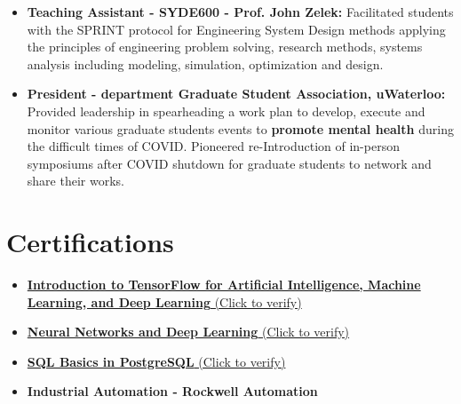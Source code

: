 \documentclass{ExpressiveResume}
\begin{document}
\begin{itemize}
\item {\textbf{Teaching Assistant - SYDE600 - Prof. John Zelek:} Facilitated students with the SPRINT protocol for Engineering System Design methods applying the principles of engineering problem solving, research methods, systems analysis including modeling, simulation, optimization and design.}
\item {\textbf{\textcolor{link_blue}{President} - department \textcolor{link_blue}{Graduate Student Association}, uWaterloo:} Provided leadership in spearheading a work plan to develop, execute and monitor various graduate students events to \textbf{\textcolor{link_blue}{promote mental health}} during the difficult times of COVID. Pioneered re-Introduction of in-person symposiums after COVID shutdown for graduate students to network and share their works.}
\newline


\end{itemize}


\section{\textcolor{link_blue}{Certifications}}
\begin{itemize}
\item {\href{https://www.coursera.org/account/accomplishments/verify/C7C8CPGARXJW?utm_source=link&utm_medium=certificate&utm_content=cert_image&utm_campaign=pdf_header_button&utm_product=course}{\textbf{Introduction to TensorFlow for Artificial Intelligence, Machine Learning, and Deep Learning} (Click to verify)}}
\item {\href{https://www.coursera.org/account/accomplishments/verify/ZRBWP4ZFF8YX}{\textbf{Neural Networks and Deep Learning} (Click to verify)}}
\item {\href{https://learnsql.com/files/course-certificate/dcQdkgNWcDbdVjeWXGwKXFTHqxkLQXbYCCJYexdB}{\textbf{SQL Basics in PostgreSQL} (Click to verify)}}
\item {\textbf{Industrial Automation - Rockwell Automation}}
\newline

\end{itemize}
\end{document}
